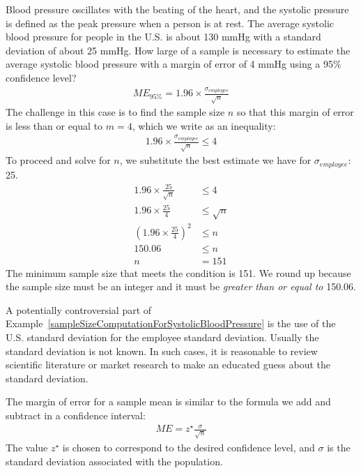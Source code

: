 \begin{example}{Blood pressure oscillates with the beating of the heart, and the systolic pressure is defined as the peak pressure when a person is at rest. The average systolic blood pressure for people in the U.S. is about 130 mmHg with a standard deviation of about 25 mmHg. How large of a sample is necessary to estimate the average systolic blood pressure with a margin of error of 4 mmHg using a 95\% confidence level?}\label{sampleSizeComputationForSystolicBloodPressure}
\textA{\vspace{-6mm}}
\begin{align*}
ME_{95\%} = 1.96\times\frac{\sigma_{employee}}{\sqrt{n}}
\end{align*}
The challenge in this case is to find the sample size $n$ so that this margin of error is less than or equal to $m = 4$, which we write as an inequality:\textA{-1mm}
\begin{align*}
1.96\times \frac{\sigma_{employee}}{\sqrt{n}} \leq 4
\end{align*}
To proceed and solve for $n$, we substitute the best estimate we have for $\sigma_{employee}$: 25.\textA{\vspace{-1mm}}
\begin{align*}
1.96\times\frac{25}{\sqrt{n}}
	&\leq 4 \\
1.96\times\frac{25}{4} &\leq \sqrt{n} \\
\left(1.96\times\frac{25}{4}\right)^2 &\leq n \\
150.06 &\leq n \\
 n &= 151
\end{align*}
The minimum sample size that meets the condition is 151. We round up because the sample size must be an integer and it must be  \emph{greater than or equal to} 150.06.
\end{example}

A potentially controversial part of Example~\ref{sampleSizeComputationForSystolicBloodPressure} is the use of the U.S. standard deviation for the employee standard deviation. Usually the standard deviation is not known. In such cases, it is reasonable to review scientific literature or market research to make an educated guess about the standard deviation.

\begin{termBox}{
The margin of error for a sample mean is similar to the formula we add and subtract in a confidence interval:
\begin{align*}
ME = z^{\star}\frac{\sigma}{\sqrt{n}}
\end{align*}
The value $z^{\star}$ is chosen to correspond to the desired confidence level, and $\sigma$ is the standard deviation associated with the population.}
\end{termBox}


